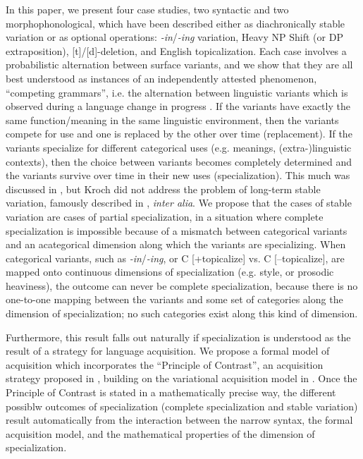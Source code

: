 \documentclass[a4paper,aps,prl,12pt,tightenlines,superscriptaddress]{revtex4}
\begin{document}
In this paper, we present four case studies, two syntactic and two morphophonological, which have been described either as diachronically stable variation or as optional operations: \textsl{-in}/\textsl{-ing} variation, Heavy NP Shift (or DP extraposition), [t]/[d]-deletion, and English topicalization.
Each case involves a probabilistic alternation between surface variants, and we show that they are all best understood as instances of an independently attested phenomenon, ``competing grammars'', i.e. the alternation between linguistic variants which is observed during a language change in progress \citep[][]{kroch1989}.
If the variants have exactly the same function/meaning in the same linguistic environment, then the variants compete for use and one is replaced by the other over time (replacement). 
If the variants specialize for different categorical uses (e.g. meanings, (extra-)linguistic  contexts), then the choice between variants becomes completely determined and the variants survive over time in their new uses (specialization). 
This much was discussed in \citet{kroch1994}, but Kroch did not address the problem of long-term stable variation, famously described in \citet{labov1989}, \textsl{inter alia}. 
We propose that the cases of stable variation are cases of partial specialization, in a situation where complete specialization is impossible because of a mismatch between categorical variants and an acategorical dimension along which the variants are specializing.
When categorical variants, such as \textsl{-in}/\textsl{-ing}, or C [+topicalize] vs. C [--topicalize], are mapped onto continuous dimensions of specialization (e.g. style, or prosodic heaviness), the outcome can never be complete specialization, because there is no one-to-one mapping between the variants and some set of categories along the dimension of specialization; no such categories exist along this kind of dimension.
 
Furthermore, this result falls out naturally if specialization is understood as the result of a strategy for language acquisition. 
We propose a formal model of acquisition which incorporates the ``Principle of Contrast'', an acquisition strategy proposed in \citet{clark1987, clark1990}, building on the variational acquisition model in \citet{yang2000}.
Once the Principle of Contrast is stated in a mathematically precise way, the different possiblw outcomes of specialization (complete specialization and stable variation) result automatically from the interaction between the narrow syntax, the formal acquisition model, and the mathematical properties of the dimension of specialization.



\end{document}
